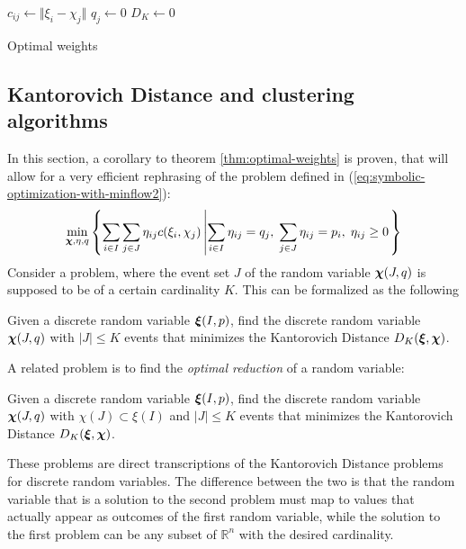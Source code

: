 \begin{algorithm}
  $c_{ij} \leftarrow \Vert \xi_i - \chi_j\Vert$
  $q_j \leftarrow 0$\;
  $D_K \leftarrow 0$\;
  \caption{Optimal weights}
  \label{alg:optimal-weights}
\end{algorithm}
\subsection{Kantorovich Distance and clustering algorithms}
\label{sec:kantorovich-and-clusters}
In this section, a corollary to theorem \ref{thm:optimal-weights} is proven, that will allow for a very efficient rephrasing of the problem defined in (\ref{eq:symbolic-optimization-with-minflow2}):
\[
  \min_{\boldsymbol\chi,\eta,q}\left\{\sum_{i\in I}\sum_{j\in J}\eta_{ij}c(\xi_i,\chi_j)\left|\sum_{i\in I}\eta_{ij}=q_j,\;\sum_{j\in J}\eta_{ij}=p_i,\;\eta_{ij}\geq 0\right.\right\}
\]
Consider a problem, where the event set $J$ of the random variable $\boldsymbol\chi(J,q)$ is supposed to be of a certain cardinality $K$.
This can be formalized as the following
\begin{problem}
\label{prb:CE-Kantorovich-randvar}
  Given a discrete random variable $\boldsymbol\xi(I,p)$, find the discrete random variable $\boldsymbol\chi(J,q)$ with $|J | \leq K$ events that minimizes the Kantorovich Distance $D_K(\boldsymbol\xi,\boldsymbol\chi)$.
\end{problem}
A related problem is to find the \textit{optimal reduction} of a random variable:
\begin{problem}
  \label{prb:DE-Kantorovich-randvar}
  Given a discrete random variable $\boldsymbol\xi(I,p)$, find the discrete random variable $\boldsymbol\chi(J,q)$ with $\chi(J)\subset\xi(I)$ and $|J | \leq K$ events that minimizes the Kantorovich Distance $D_K(\boldsymbol\xi,\boldsymbol\chi)$.
\end{problem}
These problems are direct transcriptions of the Kantorovich Distance problems for discrete random variables.
The difference between the two is that the random variable that is a solution to the second problem must map to values that actually appear as outcomes of the first random variable,
while the solution to the first problem can be any subset of $\mathbb{R}^n$ with the desired cardinality.

